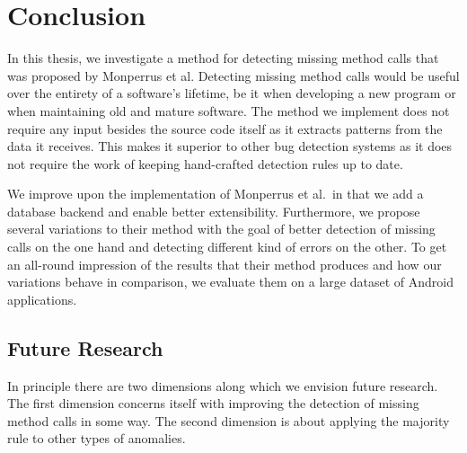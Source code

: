 \chapter{Conclusion}\label{ch:concl}

In this thesis, we investigate a method for detecting missing method calls that was proposed by Monperrus et al.
Detecting missing method calls would be useful over the entirety of a software's lifetime, be it when developing a new program or when maintaining old and mature software.
The method we implement does not require any input besides the source code itself as it extracts patterns from the data it receives.
This makes it superior to other bug detection systems as it does not require the work of keeping hand-crafted detection rules up to date.

We improve upon the implementation of Monperrus et al.\ in that we add a database backend and enable better extensibility.
Furthermore, we propose several variations to their method with the goal of better detection of missing calls on the one hand and detecting different kind of errors on the other.
To get an all-round impression of the results that their method produces and how our variations behave in comparison, we evaluate them on a large dataset of Android applications. 


\section{Future Research}

In principle there are two dimensions along which we envision future research.
The first dimension concerns itself with improving the detection of missing method calls in some way.
The second dimension is about applying the majority rule to other types of anomalies.

